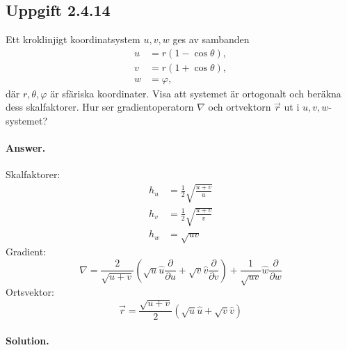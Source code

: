 \documentclass[%
oneside,                 %
final,                   %
10pt]{article}
\newenvironment{doconceexercise}{}{}
\newcounter{doconceexercisecounter}
\begin{document}
\begin{doconceexercise}

\subsection{Uppgift 2.4.14}
\label{problem:2.14}

Ett kroklinjigt koordinatsystem $u,v,w$ ges av sambanden 
\begin{align}
    u&=r(1-\cos\theta),\nonumber\\
    v&=r(1+\cos\theta),\label{uvw}\\
    w&=\varphi,\nonumber
\end{align}
där $r,\theta,\varphi$ är sfäriska koordinater. Visa att systemet är ortogonalt och beräkna dess skalfaktorer. Hur ser gradientoperatorn $\nabla$ och ortvektorn $\vec r$ ut i $u,v,w$-systemet?


\paragraph{Answer.}
Skalfaktorer:
\begin{align*}
h_u  &=  \frac{1}{2} \sqrt{\frac{u+v}{u}} \\
h_v  &=  \frac{1}{2} \sqrt{\frac{u+v}{v}} \\
h_w  &=  \sqrt{uv}
\end{align*}
Gradient: 
\begin{equation*}
\nabla = \frac{2}{\sqrt{u+v}}\left(\sqrt{u} \hat u
\frac{\partial}{\partial u} + \sqrt{v} \hat v
\frac{\partial}{\partial v}\right) + \frac{1}{\sqrt{uv}} \hat w
\frac{\partial}{\partial w}
\end{equation*}
Ortsvektor: 
\begin{equation*}
\vec{r} = \frac{\sqrt{u+v}}{2}(\sqrt{u} \hat u + \sqrt{v} \hat v)
\end{equation*}



\paragraph{Solution.}

\end{doconceexercise}
\end{document}
